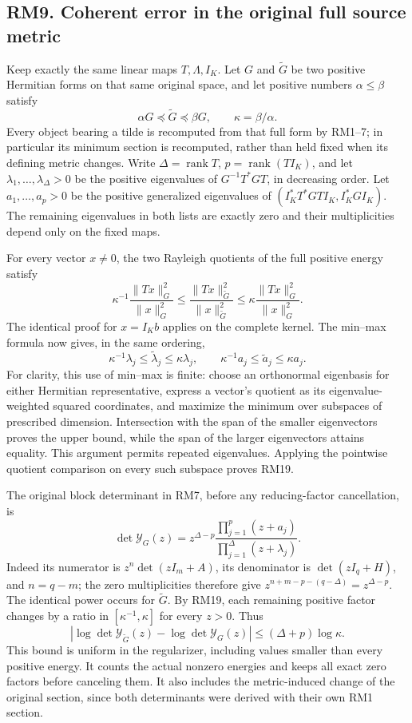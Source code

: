 \documentclass[11pt]{article}
\begin{document}
\subsection{RM9. Coherent error in the original full source metric}\label{rm9.-coherent-error-in-the-original-full-source-metric}

Keep exactly the same linear maps \(T,\Lambda,I_K\). Let \(G\) and \(\widetilde G\) be two positive Hermitian forms on that same original space, and let positive numbers \(\alpha\le\beta\) satisfy \[
 \alpha G\preceq\widetilde G\preceq\beta G,\qquad \kappa=\beta/\alpha.
\] Every object bearing a tilde is recomputed from that full form by RM1--7; in particular its minimum section is recomputed, rather than held fixed when its defining metric changes. Write \(\Delta=\operatorname{rank}T\), \(p=\operatorname{rank}(T I_K)\), and let \(\lambda_1,\ldots,\lambda_\Delta>0\) be the positive eigenvalues of \(G^{-1}T^*GT\), in decreasing order. Let \(a_1,\ldots,a_p>0\) be the positive generalized eigenvalues of \((I_K^*T^*GTI_K,I_K^*GI_K)\). The remaining eigenvalues in both lists are exactly zero and their multiplicities depend only on the fixed maps.

For every vector \(x\ne0\), the two Rayleigh quotients of the full positive energy satisfy \[
 \kappa^{-1}\frac{\|Tx\|_G^2}{\|x\|_G^2}
 \le\frac{\|Tx\|_{\widetilde G}^2}{\|x\|_{\widetilde G}^2}
 \le\kappa\frac{\|Tx\|_G^2}{\|x\|_G^2}.
\] The identical proof for \(x=I_Kb\) applies on the complete kernel. The min--max formula now gives, in the same ordering, \[
 \kappa^{-1}\lambda_j\le\widetilde\lambda_j\le\kappa\lambda_j,
 \qquad \kappa^{-1}a_j\le\widetilde a_j\le\kappa a_j.
 \tag{RM19}
\] For clarity, this use of min--max is finite: choose an orthonormal eigenbasis for either Hermitian representative, express a vector's quotient as its eigenvalue-weighted squared coordinates, and maximize the minimum over subspaces of prescribed dimension. Intersection with the span of the smaller eigenvectors proves the upper bound, while the span of the larger eigenvectors attains equality. This argument permits repeated eigenvalues. Applying the pointwise quotient comparison on every such subspace proves RM19.

The original block determinant in RM7, before any reducing-factor cancellation, is \[
 \det\mathscr Y_G(z)=z^{\Delta-p}
 \frac{\prod_{j=1}^{p}(z+a_j)}{\prod_{j=1}^{\Delta}(z+\lambda_j)}.
\] Indeed its numerator is \(z^n\det(zI_m+A)\), its denominator is \(\det(zI_q+H)\), and \(n=q-m\); the zero multiplicities therefore give \(z^{n+m-p-(q-\Delta)}=z^{\Delta-p}\). The identical power occurs for \(\widetilde G\). By RM19, each remaining positive factor changes by a ratio in \([\kappa^{-1},\kappa]\) for every \(z>0\). Thus \[
 \boxed{\left|\log\det\mathscr Y_{\widetilde G}(z)
       -\log\det\mathscr Y_G(z)\right|
 \le(\Delta+p)\log\kappa.}
 \tag{RM20}
\] This bound is uniform in the regularizer, including values smaller than every positive energy. It counts the actual nonzero energies and keeps all exact zero factors before canceling them. It also includes the metric-induced change of the original section, since both determinants were derived with their own RM1 section.
\end{document}
